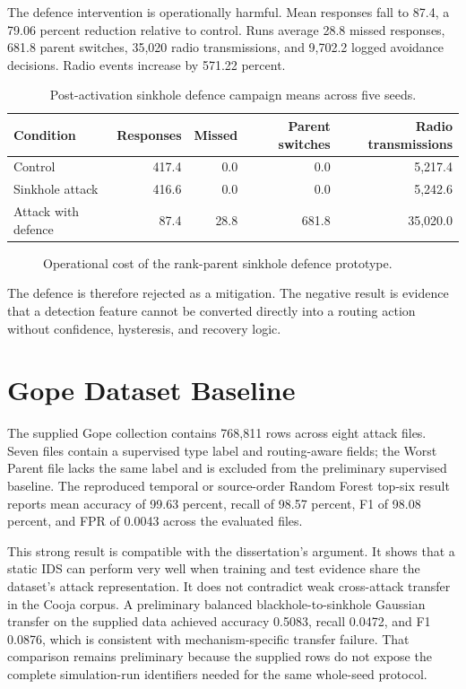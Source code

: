 The defence intervention is operationally harmful. Mean responses fall to 87.4, a 79.06 percent reduction relative to control. Runs average 28.8 missed responses, 681.8 parent switches, 35,020 radio transmissions, and 9,702.2 logged avoidance decisions. Radio events increase by 571.22 percent.

\begin{table}[H]
\centering
\caption{Post-activation sinkhole defence campaign means across five seeds.}
\label{tab:defence}
\begin{tabular}{lrrrr}
\toprule
Condition & Responses & Missed & Parent switches & Radio transmissions \\
\midrule
Control & 417.4 & 0.0 & 0.0 & 5,217.4 \\
Sinkhole attack & 416.6 & 0.0 & 0.0 & 5,242.6 \\
Attack with defence & 87.4 & 28.8 & 681.8 & 35,020.0 \\
\bottomrule
\end{tabular}
\end{table}

\begin{figure}[H]
\centering

\caption{Operational cost of the rank-parent sinkhole defence prototype.}
\label{fig:defence-cost}
\end{figure}

The defence is therefore rejected as a mitigation. The negative result is evidence that a detection feature cannot be converted directly into a routing action without confidence, hysteresis, and recovery logic.

\section{Gope Dataset Baseline}

The supplied Gope collection contains 768,811 rows across eight attack files. Seven files contain a supervised type label and routing-aware fields; the Worst Parent file lacks the same label and is excluded from the preliminary supervised baseline. The reproduced temporal or source-order Random Forest top-six result reports mean accuracy of 99.63 percent, recall of 98.57 percent, F1 of 98.08 percent, and FPR of 0.0043 across the evaluated files.

This strong result is compatible with the dissertation's argument. It shows that a static IDS can perform very well when training and test evidence share the dataset's attack representation. It does not contradict weak cross-attack transfer in the Cooja corpus. A preliminary balanced blackhole-to-sinkhole Gaussian transfer on the supplied data achieved accuracy 0.5083, recall 0.0472, and F1 0.0876, which is consistent with mechanism-specific transfer failure. That comparison remains preliminary because the supplied rows do not expose the complete simulation-run identifiers needed for the same whole-seed protocol.

